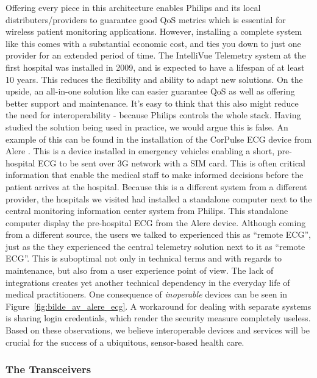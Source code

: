 Offering every piece in this architecture enables Philips and its local distributers/providers to guarantee good QoS metrics which is essential for wireless patient monitoring applications. However, installing a complete system like this comes with a substantial economic cost, and ties you down to just one provider for an extended period of time. The IntelliVue Telemetry system at the first hospital was installed in 2009, and is expected to have a lifespan of at least 10 years. This reduces the flexibility and ability to adapt new solutions. On the upside, an all-in-one solution like can easier guarantee QoS as well as offering better support and maintenance. It's easy to think that this also might reduce the need for interoperability - because Philips controls the whole stack. Having studied the solution being used in practice, we would argue this is false. An example of this can be found in the installation of the CorPulse ECG device from Alere \cite{alere}. This is a device installed in emergency vehicles enabling a short, pre-hospital ECG to be sent over 3G network with a SIM card. This is often critical information that enable the medical staff to make informed decisions before the patient arrives at the hospital. Because this is a different system from a different provider, the hospitals we visited had installed a standalone computer next to the central monitoring information center system from Philips. This standalone computer display the pre-hospital ECG from the Alere device. Although coming from a different source, the users we talked to experienced this as ``remote ECG'', just as the they experienced the central telemetry solution next to it as ``remote ECG''. This is suboptimal not only in technical terms and with regards to maintenance, but also from a user experience point of view. The lack of integrations creates yet another technical dependency in the everyday life of medical practitioners. One consequence of \emph{inoperable} devices can be seen in Figure~\ref{fig:bilde_av_alere_ecg}. A workaround for dealing with separate systems is sharing login credentials, which render the security measure completely useless. Based on these observations, we believe interoperable devices and services will be crucial for the success of a ubiquitous, sensor-based health care.


\subsubsection{The Transceivers} %
\label{ssub:the_transceivers}

